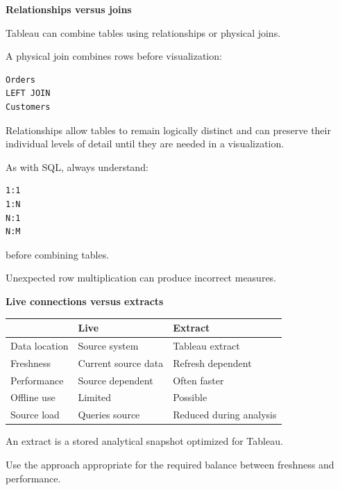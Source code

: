\documentclass[11pt,letterpaper]{article}
\begin{document}

\textbf{Relationships versus joins}

Tableau can combine tables using relationships or physical joins.

A physical join combines rows before visualization:

\begin{lstlisting}
Orders
LEFT JOIN
Customers
\end{lstlisting}

Relationships allow tables to remain logically distinct and can preserve their
individual levels of detail until they are needed in a visualization.

As with SQL, always understand:

\begin{lstlisting}
1:1
1:N
N:1
N:M
\end{lstlisting}

before combining tables.

Unexpected row multiplication can produce incorrect measures.



\textbf{Live connections versus extracts}

\begin{center}
\begin{tabularx}{\textwidth}{lXX}
\toprule
 & Live & Extract \\
\midrule
Data location & Source system & Tableau extract \\
Freshness & Current source data & Refresh dependent \\
Performance & Source dependent & Often faster \\
Offline use & Limited & Possible \\
Source load & Queries source & Reduced during analysis \\
\bottomrule
\end{tabularx}
\end{center}

An extract is a stored analytical snapshot optimized for Tableau.

Use the approach appropriate for the required balance between freshness and
performance.


\end{document}
